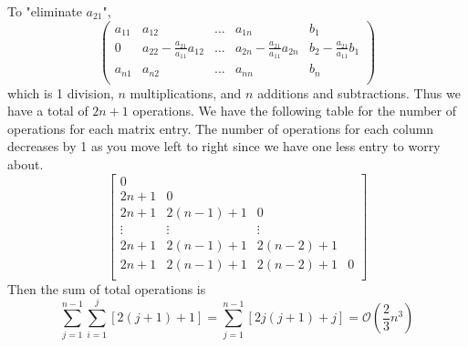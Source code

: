 \documentclass[11pt]{article}
\begin{document}
To "eliminate $a_{21}$",
\[
    \begin{pmatrix}
        a_{11} & a_{12}& \dots& a_{1n} & b_1 \\
        0 & a_{22} - \frac{a_{21}}{a_{11}}a_{12} & \dots & a_{2n}- \frac{a_{21}}{a_{11}}a_{2n}  & b_2 - \frac{a_{21}}{a_{11}}b_{1} \\
        a_{n1} & a_{n2} &\dots & a_{nn} & b_n \\
    \end{pmatrix}
\] 
which is 1 division, $n$ multiplications, and $n$ additions and subtractions. Thus we have a total of $2n+1$ operations. We have the following table for the number of operations
for each matrix entry. The number of operations for each column decreases by 1 as you move left to right since we have one less entry to worry about.
\[
    \begin{bmatrix}
        0\\
        2n+1 & 0\\
        2n+1 & 2(n-1)+1 & 0\\
        \vdots & \vdots & \vdots\\
        2n+1& 2(n-1)+1 & 2(n-2)+1\\
        2n+1& 2(n-1)+1& 2(n-2)+1 & 0\\
    \end{bmatrix}
\]
Then the sum of total operations is
\[
    \sum_{j=1}^{n-1} \sum_{i=1}^{j} [2(j+1)+1] = \sum_{j=1}^{n-1} [2j(j+1)+j] = \mathcal{O}(\frac{2}{3}n^3)
\]
\end{document}
